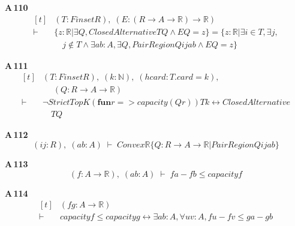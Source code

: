 \noindent\textbf{A\,110}\quad{}
{\footnotesize\[ \begin{aligned}[t]
&(\mathit{T} : \mathit{Finset} \mathit{R}),\; (\mathit{E} : (\mathit{R} \to \mathit{A} \to \mathbb{R} ) \to \mathbb{R} )\\
\vdash\;&\{ \mathit{z} : \mathbb{R} | \exists \mathit{Q}, \mathit{ClosedAlternative} \mathit{T} \mathit{Q} \wedge \mathit{E} \mathit{Q} = \mathit{z}\} = \{ \mathit{z} : \mathbb{R} | \exists \mathit{i} \in \mathit{T}, \exists \mathit{j},\\
&\quad \mathit{j} \notin \mathit{T} \wedge \exists \mathit{a} \mathit{b} : \mathit{A}, \exists \mathit{Q}, \mathit{PairRegion} \mathit{Q} \mathit{i} \mathit{j} \mathit{a} \mathit{b} \wedge \mathit{E} \mathit{Q} = \mathit{z}\}
\end{aligned} \]}

\noindent\textbf{A\,111}\quad{}
{\footnotesize\[ \begin{aligned}[t]
&(\mathit{T} : \mathit{Finset} \mathit{R}),\; (\mathit{k} : \mathbb{N} ),\; (\mathit{hcard} : \mathit{T}.\mathit{card} = \mathit{k}),\\
&\quad \; (\mathit{Q} : \mathit{R} \to \mathit{A} \to \mathbb{R} )\\
\vdash\;&\neg \mathit{StrictTopK} (\mathbf{fun} \mathit{r} => \mathit{capacity} (\mathit{Q} \mathit{r})) \mathit{T} \mathit{k} \leftrightarrow \mathit{ClosedAlternative}\\
&\quad \mathit{T} \mathit{Q}
\end{aligned} \]}

\noindent\textbf{A\,112}\quad{}
{\footnotesize\[ (\mathit{i} \mathit{j} : \mathit{R}),\; (\mathit{a} \mathit{b} : \mathit{A}) \;\vdash\; \mathit{Convex} \mathbb{R} \{ \mathit{Q} : \mathit{R} \to \mathit{A} \to \mathbb{R} | \mathit{PairRegion} \mathit{Q} \mathit{i} \mathit{j} \mathit{a} \mathit{b}\} \]}

\noindent\textbf{A\,113}\quad{}
{\footnotesize\[ (\mathit{f} : \mathit{A} \to \mathbb{R} ),\; (\mathit{a} \mathit{b} : \mathit{A}) \;\vdash\; \mathit{f} \mathit{a} - \mathit{f} \mathit{b} \leq \mathit{capacity} \mathit{f} \]}

\noindent\textbf{A\,114}\quad{}
{\footnotesize\[ \begin{aligned}[t]
&(\mathit{f} \mathit{g} : \mathit{A} \to \mathbb{R} )\\
\vdash\;&\mathit{capacity} \mathit{f} \leq \mathit{capacity} \mathit{g} \leftrightarrow \exists \mathit{a} \mathit{b} : \mathit{A}, \forall \mathit{u} \mathit{v} : \mathit{A}, \mathit{f} \mathit{u} - \mathit{f} \mathit{v} \leq \mathit{g} \mathit{a} - \mathit{g} \mathit{b}
\end{aligned} \]}

